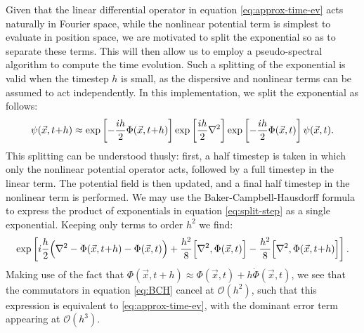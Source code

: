 \documentclass[a4paper,11pt]{article}
\begin{document}
Given that the linear differential operator in equation \ref{eq:approx-time-ev} acts naturally in Fourier space, while the nonlinear potential term is simplest to evaluate in position space, we are motivated to split the exponential so as to separate these terms. This will then allow us to employ a pseudo-spectral algorithm to compute the time evolution. Such a splitting of the exponential is valid when the timestep $h$ is small, as the dispersive and nonlinear terms can be assumed to act independently. In this implementation, we split the exponential as follows:
\begin{equation}\label{eq:split-step}
    \psi(\vec{x},t\hspace*{-.2em}+\hspace*{-.2em}h)\approx\operatorname{exp}\left[-\frac{ih}{2}\Phi(\vec{x},t\hspace*{-.2em}+\hspace*{-.2em}h)\right]\operatorname{exp}\left[\frac{ih}{2}\nabla^2\right]\operatorname{exp}\left[-\frac{ih}{2}\Phi(\vec{x},t)\right]\psi(\vec{x},t).
\end{equation}
This splitting can be understood thusly: first, a half timestep is taken in which only the nonlinear potential operator acts, followed by a full timestep in the linear term. The potential field is then updated, and a final half timestep in the nonlinear term is performed. We may use the Baker-Campbell-Hausdorff formula to express the product of exponentials in equation \ref{eq:split-step} as a single exponential. Keeping only terms to order $h^2$ we find:
\begin{equation}\label{eq:BCH}
    \operatorname{exp}\left[i\frac{h}{2}\Big(\nabla^2-\Phi(\vec{x},t\hspace*{-.2em}+\hspace*{-.2em}h)-\Phi(\vec{x},t)\Big)+\frac{h^2}{8}\Big[\nabla^2,\Phi(\vec{x},t)\Big]-\frac{h^2}{8}\Big[\nabla^2,\Phi(\vec{x},t\hspace*{-.2em}+\hspace*{-.2em}h)\Big]\right].
\end{equation}
Making use of the fact that $\Phi(\vec{x},t+h)\approx\Phi(\vec{x},t)+h\Dot{\Phi}(\vec{x},t)$, we see that the commutators in equation \ref{eq:BCH} cancel at $\mathcal{O}(h^2)$, such that this expression is equivalent to \ref{eq:approx-time-ev}, with the dominant error term appearing at $\mathcal{O}(h^3)$. 
\end{document}
